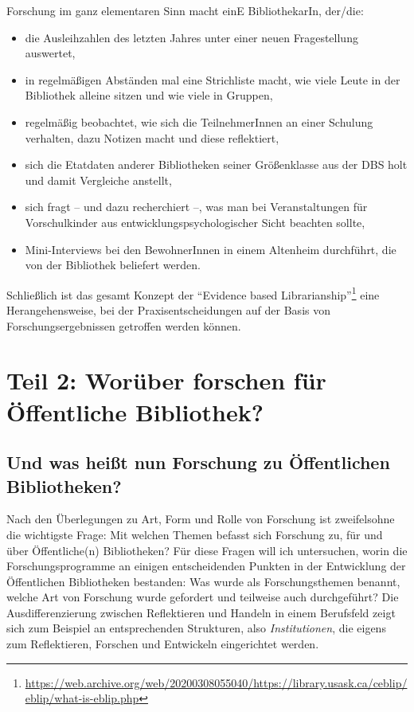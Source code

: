 \documentclass[a4paper,
fontsize=11pt,
oneside,
numbers=noperiodatend,
parskip=half-,
bibliography=totoc,
final
]{scrartcl}
\begin{document}
Forschung im ganz elementaren Sinn macht einE BibliothekarIn, der/die:

\begin{itemize}
\item
  die Ausleihzahlen des letzten Jahres unter einer neuen Fragestellung
  auswertet,
\item
  in regelmäßigen Abständen mal eine Strichliste macht, wie viele Leute
  in der Bibliothek alleine sitzen und wie viele in Gruppen,
\item
  regelmäßig beobachtet, wie sich die TeilnehmerInnen an einer Schulung
  verhalten, dazu Notizen macht und diese reflektiert,
\item
  sich die Etatdaten anderer Bibliotheken seiner Größenklasse aus der
  DBS holt und damit Vergleiche anstellt,
\item
  sich fragt -- und dazu recherchiert --, was man bei Veranstaltungen
  für Vorschulkinder aus entwicklungspsychologischer Sicht beachten
  sollte,
\item
  Mini-Interviews bei den BewohnerInnen in einem Altenheim durchführt,
  die von der Bibliothek beliefert werden.
\end{itemize}

Schließlich ist das gesamt Konzept der \enquote{Evidence based
Librarianship}\footnote{\url{https://web.archive.org/web/20200308055040/https://library.usask.ca/ceblip/eblip/what-is-eblip.php}}
eine Herangehensweise, bei der Praxisentscheidungen auf der Basis von
Forschungsergebnissen getroffen werden können.

\hypertarget{teil-2-woruxfcber-forschen-fuxfcr-uxf6ffentliche-bibliothek}{%
\section{Teil 2: Worüber forschen für Öffentliche
Bibliothek?}\label{teil-2-woruxfcber-forschen-fuxfcr-uxf6ffentliche-bibliothek}}

\hypertarget{und-was-heiuxdft-nun-forschung-zu-uxf6ffentlichen-bibliotheken}{%
\subsection{Und was heißt nun Forschung zu Öffentlichen
Bibliotheken?}\label{und-was-heiuxdft-nun-forschung-zu-uxf6ffentlichen-bibliotheken}}

Nach den Überlegungen zu Art, Form und Rolle von Forschung ist
zweifelsohne die wichtigste Frage: Mit welchen Themen befasst sich
Forschung zu, für und über Öffentliche(n) Bibliotheken? Für diese Fragen
will ich untersuchen, worin die Forschungsprogramme an einigen
entscheidenden Punkten in der Entwicklung der Öffentlichen Bibliotheken
bestanden: Was wurde als Forschungsthemen benannt, welche Art von
Forschung wurde gefordert und teilweise auch durchgeführt? Die
Ausdifferenzierung zwischen Reflektieren und Handeln in einem Berufsfeld
zeigt sich zum Beispiel an entsprechenden Strukturen, also
\emph{Institutionen}, die eigens zum Reflektieren, Forschen und
Entwickeln eingerichtet werden.
\end{document}
